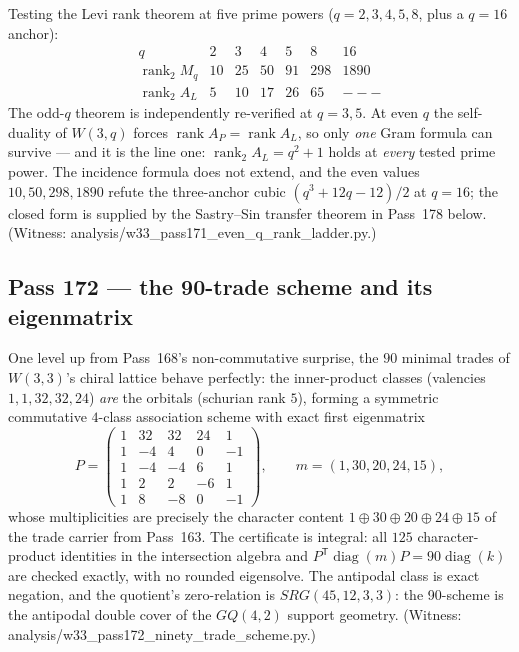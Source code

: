 \documentclass[12pt,a4paper]{article}
\def\mathrm#1{#1}%
\def\texttt#1{#1}%
\def\text#1{#1}%
\theoremstyle{definition}
\newcommand{\SRG}{\mathrm{SRG}}
\newcommand{\GQ}{\mathrm{GQ}}
\begin{document}
Testing the Levi rank theorem at five prime powers ($q=2,3,4,5,8$, plus a
$q=16$ anchor):
\[
\begin{array}{l|c|c|c|c|c|c}
 q & 2 & 3 & 4 & 5 & 8 & 16\\\hline
 \operatorname{rank}_2 M_q & 10 & 25 & 50 & 91 & 298 & 1890\\
 \operatorname{rank}_2 A_L & 5 & 10 & 17 & 26 & 65 & \text{---}
\end{array}
\]
The odd-$q$ theorem is independently re-verified at $q=3,5$. At even $q$
the self-duality of $W(3,q)$ forces
$\operatorname{rank}A_P=\operatorname{rank}A_L$, so only \emph{one} Gram
formula can survive --- and it is the line one:
$\operatorname{rank}_2A_L=q^2+1$ holds at \emph{every} tested prime power.
The incidence formula does not extend, and the even values
$10,50,298,1890$ refute the three-anchor cubic $(q^3{+}12q{-}12)/2$ at
$q=16$; the closed form is supplied by the Sastry--Sin transfer theorem in
Pass~178 below. (Witness:
\texttt{analysis/w33\_pass171\_even\_q\_rank\_ladder.py}.)

\subsection{Pass 172 --- the 90-trade scheme and its eigenmatrix}
\label{ssec:pass172}

One level up from Pass~168's non-commutative surprise, the $90$ minimal
trades of $W(3,3)$'s chiral lattice behave perfectly: the inner-product
classes (valencies $1,1,32,32,24$) \emph{are} the orbitals (schurian rank
$5$), forming a symmetric commutative $4$-class association scheme with
exact first eigenmatrix
\[
P=\begin{pmatrix}
1&32&32&24&1\\
1&-4&4&0&-1\\
1&-4&-4&6&1\\
1&2&2&-6&1\\
1&8&-8&0&-1
\end{pmatrix},
\qquad
m=(1,30,20,24,15),
\]
whose multiplicities are precisely the character content
$1\oplus30\oplus20\oplus24\oplus15$ of the trade carrier from Pass~163.
The certificate is integral: all $125$ character-product identities in
the intersection algebra and
$P^{\mathsf T}\operatorname{diag}(m)P=90\operatorname{diag}(k)$ are checked
exactly, with no rounded eigensolve.
The antipodal class is exact negation, and the quotient's zero-relation is
$\SRG(45,12,3,3)$: the 90-scheme is the antipodal double cover of the
$\GQ(4,2)$ support geometry. (Witness:
\texttt{analysis/w33\_pass172\_ninety\_trade\_scheme.py}.)
\end{document}
